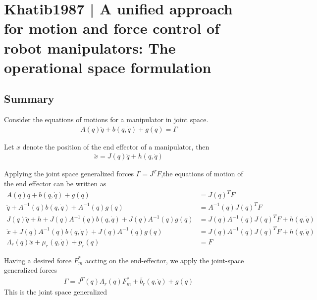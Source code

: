 \section{Khatib1987 | A unified approach for motion and force control of robot manipulators: The operational space formulation}

\cite{khatib1987} 

\subsection{Summary}

Consider the equations of motions for a manipulator in joint space.
\begin{align}
    A(q)\ddot q + b(q, \dot q) + g(q) = \Gamma
\end{align}

Let $x$ denote the position of the end effector of a manipulator, then
\begin{align}
    \ddot x = J(q) \ddot q + h(q, \dot q)
\end{align}

Applying the joint space generalized forces $\Gamma = J^T F$,the equations of
motion of the end effector can be written as
\begin{align}
    A(q)\ddot q + b(q, \dot q) + g(q) &= J(q)^T F \\
    \ddot q + A^{-1}(q) b(q, \dot q) + A^{-1}(q) g(q) &= A^{-1}(q) J(q)^T F \\
    J(q) \ddot q + h + J(q) A^{-1}(q) b(q, \dot q) + J(q) A^{-1}(q) g(q) &= J(q) A^{-1}(q) J(q)^T F + h(q, \dot q)\\
    \ddot x + J(q) A^{-1}(q) b(q, \dot q) + J(q) A^{-1}(q) g(q) &= J(q) A^{-1}(q) J(q)^T F + h(q, \dot q)\\
    \Lambda_r(q) \ddot x + \mu_r(q, \dot q) + p_r(q) &= F
\end{align}

Having a desired force $F_m^*$ accting on the end-effector, we apply the
joint-space generalized forces
\begin{align}
    \Gamma = J^T(q) \Lambda_r(q) F_m^* + \bar{b}_r(q, \dot q) + g(q)
\end{align}
This is the joint space generalized
